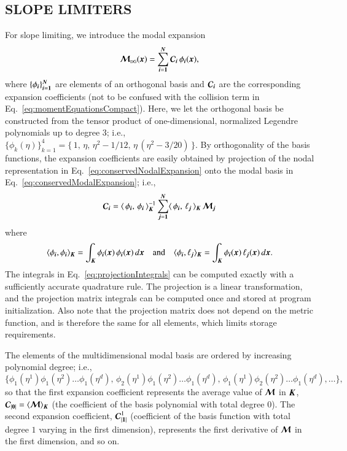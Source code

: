 \documentclass[11pt,letterpaper,twoside,english,final]{article}
\begin{document}
\subsection{SLOPE LIMITERS}
\label{sec:slopeLimiters}

For slope limiting, we introduce the modal expansion
\begin{equation}
  \boldsymbol{\mathcal{M}}_{\mbox{\tiny DG}}(\boldsymbol{x})=\sum_{\boldsymbol{i}=\boldsymbol{1}}^{\boldsymbol{N}}\boldsymbol{\mathcal{C}}_{\boldsymbol{i}}\,\phi_{\boldsymbol{i}}(\boldsymbol{x}),
  \label{eq:conservedModalExpansion}
\end{equation}
where $\{\phi_{\boldsymbol{i}}\}_{\boldsymbol{i}=\boldsymbol{1}}^{\boldsymbol{N}}$ are elements of an orthogonal basis and $\boldsymbol{\mathcal{C}}_{\boldsymbol{i}}$ are the corresponding expansion coefficients (not to be confused with the collision term in Eq.~\eqref{eq:momentEquationsCompact}).  
Here, we let the orthogonal basis be constructed from the tensor product of one-dimensional, normalized Legendre polynomials up to degree 3; i.e., $\{\phi_{k}(\eta)\}_{k=1}^{4}=\{\,1,\,\eta,\,\eta^{2}-1/12,\,\eta\,(\eta^{2}-3/20)\,\}$.  
By orthogonality of the basis functions, the expansion coefficients are easily obtained by projection of the nodal representation in Eq.~\eqref{eq:conservedNodalExpansion} onto the modal basis in Eq.~\eqref{eq:conservedModalExpansion}; i.e.,
\begin{equation}
  \boldsymbol{\mathcal{C}}_{\boldsymbol{i}}
  =\langle\,\phi_{\boldsymbol{i}},\,\phi_{\boldsymbol{i}}\,\rangle_{\boldsymbol{K}}^{-1}\sum_{\boldsymbol{j}=\boldsymbol{1}}^{\boldsymbol{N}}\langle\,\phi_{\boldsymbol{i}},\,\ell_{\boldsymbol{j}}\,\rangle_{\boldsymbol{K}}\,\boldsymbol{\mathcal{M}}_{\boldsymbol{j}}
\end{equation}
where
\begin{equation}
  \langle\phi_{\boldsymbol{i}},\phi_{\boldsymbol{i}}\rangle_{\boldsymbol{K}}=\int_{\boldsymbol{K}}\phi_{\boldsymbol{i}}(\boldsymbol{x})\,\phi_{\boldsymbol{i}}(\boldsymbol{x})\,d\boldsymbol{x}
  \quad\text{and}\quad
  \langle\phi_{\boldsymbol{i}},\ell_{\boldsymbol{j}}\rangle_{\boldsymbol{K}}=\int_{\boldsymbol{K}}\phi_{\boldsymbol{i}}(\boldsymbol{x})\,\ell_{\boldsymbol{j}}(\boldsymbol{x})\,d\boldsymbol{x}.
  \label{eq:projectionIntegrals}
\end{equation}
The integrals in Eq.~\eqref{eq:projectionIntegrals} can be computed exactly with a sufficiently accurate quadrature rule.  
The projection is a linear transformation, and the projection matrix integrals can be computed once and stored at program initialization.  
Also note that the projection matrix does not depend on the metric function, and is therefore the same for all elements, which limits storage requirements.  

The elements of the multidimensional modal basis are ordered by increasing polynomial degree; i.e., 
\begin{equation}
  \{\phi_{1}(\eta^{1})\phi_{1}(\eta^{2})\ldots\phi_{1}(\eta^{d}),\,\phi_{2}(\eta^{1})\phi_{1}(\eta^{2})\ldots\phi_{1}(\eta^{d}),\,\phi_{1}(\eta^{1})\phi_{2}(\eta^{2})\ldots\phi_{1}(\eta^{d}),\ldots\},
\end{equation}
so that the first expansion coefficient represents the average value of $\boldsymbol{\mathcal{M}}$ in $\boldsymbol{K}$, $\boldsymbol{\mathcal{C}}_{|\boldsymbol{0}|}=\langle\boldsymbol{\mathcal{M}}\rangle_{\boldsymbol{K}}$ (the coefficient of the basis polynomial with total degree $0$).  
The second expansion coefficient, $\boldsymbol{\mathcal{C}}_{|\boldsymbol{1}|}^{1}$ (coefficient of the basis function with total degree $1$ varying in the first dimension), represents the first derivative of $\boldsymbol{\mathcal{M}}$ in the first dimension, and so on.  
\end{document}
